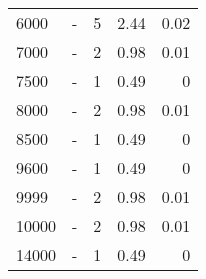 \begin{longtable}{lXrrr}
        6000 & \multicolumn{1}{X}{-} & %
          \num{5} &
          \num[round-mode=places,round-precision=2]{2,44} &
          \num[round-mode=places,round-precision=2]{0,02} \\

        7000 & \multicolumn{1}{X}{-} & %
          \num{2} &
          \num[round-mode=places,round-precision=2]{0,98} &
          \num[round-mode=places,round-precision=2]{0,01} \\

        7500 & \multicolumn{1}{X}{-} & %
          \num{1} &
          \num[round-mode=places,round-precision=2]{0,49} &
          \num[round-mode=places,round-precision=2]{0} \\

        8000 & \multicolumn{1}{X}{-} & %
          \num{2} &
          \num[round-mode=places,round-precision=2]{0,98} &
          \num[round-mode=places,round-precision=2]{0,01} \\

        8500 & \multicolumn{1}{X}{-} & %
          \num{1} &
          \num[round-mode=places,round-precision=2]{0,49} &
          \num[round-mode=places,round-precision=2]{0} \\

        9600 & \multicolumn{1}{X}{-} & %
          \num{1} &
          \num[round-mode=places,round-precision=2]{0,49} &
          \num[round-mode=places,round-precision=2]{0} \\

        9999 & \multicolumn{1}{X}{-} & %
          \num{2} &
          \num[round-mode=places,round-precision=2]{0,98} &
          \num[round-mode=places,round-precision=2]{0,01} \\

        10000 & \multicolumn{1}{X}{-} & %
          \num{2} &
          \num[round-mode=places,round-precision=2]{0,98} &
          \num[round-mode=places,round-precision=2]{0,01} \\

        14000 & \multicolumn{1}{X}{-} & %
          \num{1} &
          \num[round-mode=places,round-precision=2]{0,49} &
          \num[round-mode=places,round-precision=2]{0} \\


\end{longtable}
